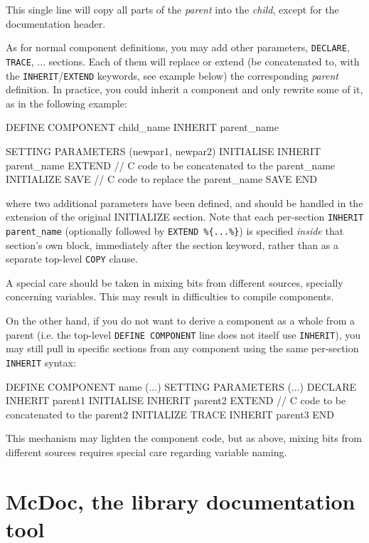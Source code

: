 This single line will copy all parts of the \textit{parent} into the \textit{child}, except for the documentation header.

As for normal component definitions, you may add other parameters,
\texttt{DECLARE}, \texttt{TRACE}, ... sections. Each of them will replace or
extend (be concatenated to, with the \texttt{INHERIT}/\texttt{EXTEND} keywords, see example below)
the corresponding \textit{parent} definition. In practice, you could inherit a
component and only rewrite some of it, as in the following example:

\begin{mcstas}
DEFINE COMPONENT  child_name INHERIT parent_name

  SETTING PARAMETERS (newpar1, newpar2) 
  INITIALISE
  INHERIT parent_name
  EXTEND 
// C code to be concatenated to the  parent_name INITIALIZE
  SAVE
// C code to replace the  parent_name SAVE 
END
\end{mcstas}
where two additional parameters have been defined, and should be handled in the
extension of the original INITIALIZE section. Note that each per-section
\texttt{INHERIT parent\_name} (optionally followed by \texttt{EXTEND \%\{...\%\}})
is specified \emph{inside} that section's own block, immediately after the
section keyword, rather than as a separate top-level \texttt{COPY} clause.

A special care should be taken in mixing bits from different sources, specially concerning variables. This may result in difficulties to compile components.

On the other hand, if you do not want to derive a component as a whole from a
parent (i.e. the top-level \texttt{DEFINE COMPONENT} line does not itself use
\texttt{INHERIT}), you may still pull in specific sections from any component
using the same per-section \texttt{INHERIT} syntax:
\begin{mcstas}
DEFINE COMPONENT  name (...)
SETTING PARAMETERS (...)
DECLARE
INHERIT parent1
INITIALISE
INHERIT parent2
EXTEND 
// C code to be concatenated to the  parent2 INITIALIZE
TRACE
INHERIT parent3
END
\end{mcstas}

This mechanism may lighten the component code, but as above, mixing bits from
different sources requires special care regarding variable naming.


\section{McDoc, the \MCS library documentation tool}
\label{s:mcdoc}

